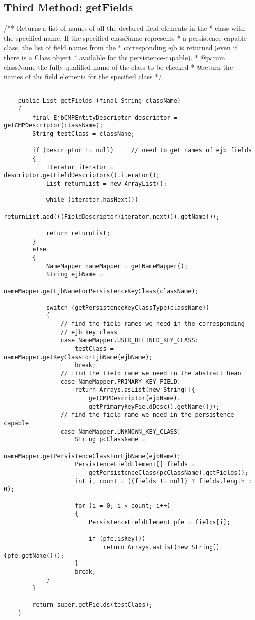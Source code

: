 \newpage
\subsection{Third Method: getFields}
/** Returns a list of names of all the declared field elements in the 
	 * class with the specified name.  If the specified className represents 
	 * a persistence-capable class, the list of field names from the  
	 * corresponding ejb is returned (even if there is a Class object 
	 * available for the persistence-capable).
	 * @param className the fully qualified name of the class to be checked 
	 * @return the names of the field elements for the specified class
	 */
\begin{lstlisting}
	
	public List getFields (final String className)
	{
		final EjbCMPEntityDescriptor descriptor = getCMPDescriptor(className);
		String testClass = className;

		if (descriptor != null)		// need to get names of ejb fields
		{
			Iterator iterator = descriptor.getFieldDescriptors().iterator();
			List returnList = new ArrayList();

			while (iterator.hasNext())
				returnList.add(((FieldDescriptor)iterator.next()).getName());

			return returnList;
		}
		else
		{
			NameMapper nameMapper = getNameMapper();
			String ejbName = 
				nameMapper.getEjbNameForPersistenceKeyClass(className);

			switch (getPersistenceKeyClassType(className))
			{
				// find the field names we need in the corresponding 
				// ejb key class
				case NameMapper.USER_DEFINED_KEY_CLASS:
					testClass = nameMapper.getKeyClassForEjbName(ejbName);
					break;
				// find the field name we need in the abstract bean 
				case NameMapper.PRIMARY_KEY_FIELD:
					return Arrays.asList(new String[]{
						getCMPDescriptor(ejbName).
						getPrimaryKeyFieldDesc().getName()});
				// find the field name we need in the persistence capable 
				case NameMapper.UNKNOWN_KEY_CLASS:
					String pcClassName = 
						nameMapper.getPersistenceClassForEjbName(ejbName);
					PersistenceFieldElement[] fields = 
						getPersistenceClass(pcClassName).getFields();
					int i, count = ((fields != null) ? fields.length : 0);

					for (i = 0; i < count; i++)
					{
						PersistenceFieldElement pfe = fields[i];

						if (pfe.isKey())
							return Arrays.asList(new String[]{pfe.getName()});
					}
					break;
			}
		}

		return super.getFields(testClass);
	}
\end{lstlisting}


